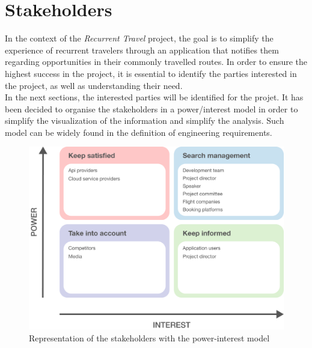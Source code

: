 \documentclass[../memory.tex]{subfiles}
\begin{document}
\section{Stakeholders}
In the context of the \emph{Recurrent Travel} project, the goal is to simplify
the experience of recurrent travelers through an application that notifies them
regarding opportunities in their commonly travelled routes. In order to ensure
the highest success in the project, it is essential to identify the parties
interested in the project, as well as understanding their need.
\\
In the next sections, the interested parties will be identified for the projet.
It has been decided to organise the stakeholders in a power/interest
model\cite{stakeholders-power-interes} in order to simplify the visualization of
the information and simplify the analysis. Such model can be widely found in
the definition of engineering requirements.
\begin{figure}[H]
	\centering
	\includegraphics[width=\textwidth]{./assets/stakeholders.png}
	\caption{Representation of the stakeholders with the power-interest model}
\end{figure}
\end{document}
